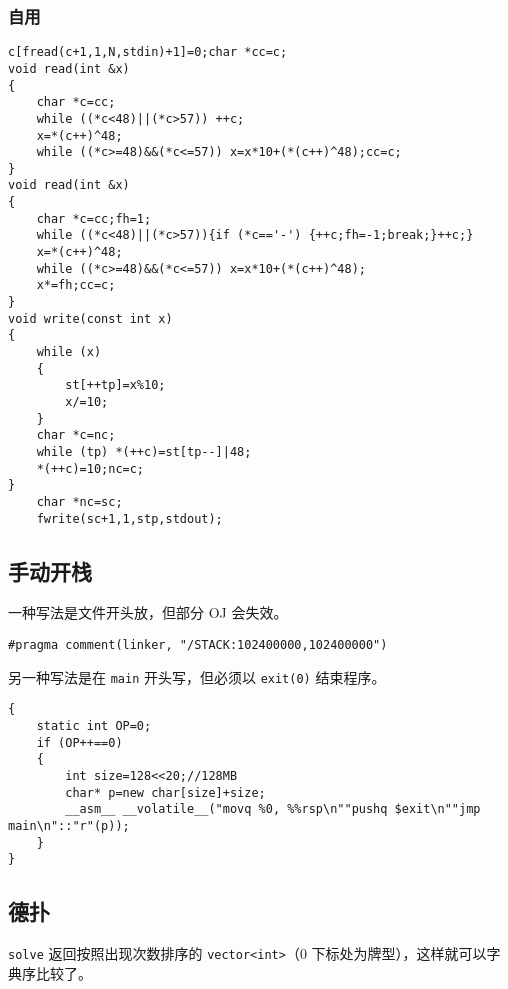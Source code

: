 \documentclass[12pt]{ctexart}
\begin{document}
\subsubsection{自用}

\begin{lstlisting}
c[fread(c+1,1,N,stdin)+1]=0;char *cc=c;
void read(int &x)
{
	char *c=cc;
	while ((*c<48)||(*c>57)) ++c;
	x=*(c++)^48;
	while ((*c>=48)&&(*c<=57)) x=x*10+(*(c++)^48);cc=c;
}
void read(int &x)
{
	char *c=cc;fh=1;
	while ((*c<48)||(*c>57)){if (*c=='-') {++c;fh=-1;break;}++c;}
	x=*(c++)^48;
	while ((*c>=48)&&(*c<=57)) x=x*10+(*(c++)^48);
	x*=fh;cc=c;
}
void write(const int x)
{
	while (x)
	{
		st[++tp]=x%10;
		x/=10;
	}
	char *c=nc;
	while (tp) *(++c)=st[tp--]|48;
	*(++c)=10;nc=c;
}
	char *nc=sc;
	fwrite(sc+1,1,stp,stdout);
\end{lstlisting}

\subsection{手动开栈}

一种写法是文件开头放，但部分 OJ 会失效。

\begin{lstlisting}
#pragma comment(linker, "/STACK:102400000,102400000")
\end{lstlisting}

另一种写法是在 \verb|main| 开头写，但必须以 \verb|exit(0)| 结束程序。

\begin{lstlisting}
{
	static int OP=0;
	if (OP++==0)
	{
		int size=128<<20;//128MB
		char* p=new char[size]+size;
		__asm__ __volatile__("movq %0, %%rsp\n""pushq $exit\n""jmp main\n"::"r"(p));
	}
}
\end{lstlisting}

\subsection{德扑}

\verb|solve| 返回按照出现次数排序的 \verb|vector<int>|（$0$ 下标处为牌型），这样就可以字典序比较了。
\end{document}
